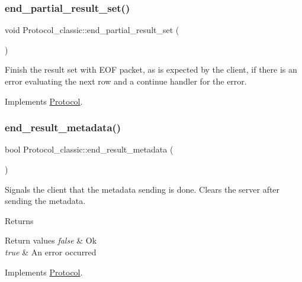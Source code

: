 \subsubsection{\texorpdfstring{end\+\_\+partial\+\_\+result\+\_\+set()}{end\_partial\_result\_set()}}
{\footnotesize\ttfamily void Protocol\+\_\+classic\+::end\+\_\+partial\+\_\+result\+\_\+set (\begin{DoxyParamCaption}{ }\end{DoxyParamCaption})\hspace{0.3cm}{\ttfamily [virtual]}}

Finish the result set with E\+OF packet, as is expected by the client, if there is an error evaluating the next row and a continue handler for the error. 

Implements \mbox{\hyperlink{classProtocol}{Protocol}}.

\mbox{\label{classProtocol__classic_a1183e18916adea57032a957a99aaee4b}} 
\subsubsection{\texorpdfstring{end\+\_\+result\+\_\+metadata()}{end\_result\_metadata()}}
{\footnotesize\ttfamily bool Protocol\+\_\+classic\+::end\+\_\+result\+\_\+metadata (\begin{DoxyParamCaption}{ }\end{DoxyParamCaption})\hspace{0.3cm}{\ttfamily [virtual]}}

Signals the client that the metadata sending is done. Clears the server after sending the metadata.

\begin{DoxyReturn}{Returns}

\end{DoxyReturn}

\begin{DoxyRetVals}{Return values}
{\em false} & Ok \\
\hline
{\em true} & An error occurred \\
\hline
\end{DoxyRetVals}


Implements \mbox{\hyperlink{classProtocol_a48bb540f0317bf418c129f441f2e82b9}{Protocol}}.

